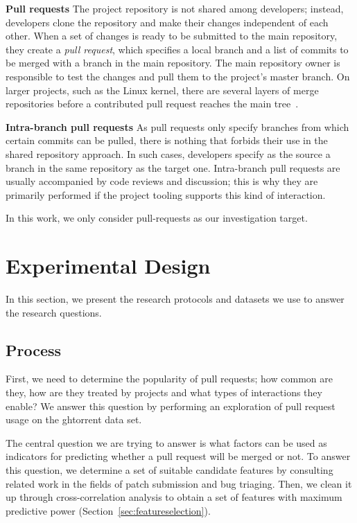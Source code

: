 \documentclass{acm_proc_article-sp}
\begin{document}
\textbf{Pull requests}
    The project repository is not shared among developers;
    instead, developers clone the repository and make their changes independent
    of each other. When a set of changes is ready to be submitted to the main
    repository, they create a \emph{pull request}, which specifies a local
    branch and a list of commits to be merged with a branch in the main
    repository. The main repository owner is responsible to test the changes and
    pull them to the project's master branch. On larger projects, such as the
    Linux kernel, there are several layers of merge repositories before a
    contributed pull request reaches the main tree~\cite{Cornf10}.

\textbf{Intra-branch pull requests}
    As pull requests only specify branches from
    which certain commits can be pulled, there is nothing that forbids their use
    in the shared repository approach. In such cases, developers specify as the
    source a branch in the same repository as the target one.
    Intra-branch pull requests are usually accompanied by code reviews and
    discussion; this is why they are primarily performed if the project tooling
    supports this kind of interaction.


In this work, we only consider pull-requests as our investigation target.

\section{Experimental Design}

In this section, we present the research protocols and datasets we use to 
answer the research questions.

\subsection{Process}
\label{sec:expprocess}

First, we need to determine the popularity of pull requests; how
common are they, how are they treated by projects and what types of 
interactions they enable? We answer this question by performing an
exploration of pull request usage on the {\sc ght}orrent data set. 

The central question we are trying to answer is what factors can be used as
indicators for predicting whether a pull request will be merged or not. To
answer this question, we determine a set of suitable candidate
features by consulting related work in the fields of patch submission and
bug triaging. Then, we clean it up through cross-correlation analysis to obtain
a set of features with maximum predictive power (Section~\ref{sec:featureselection}).
\end{document}
